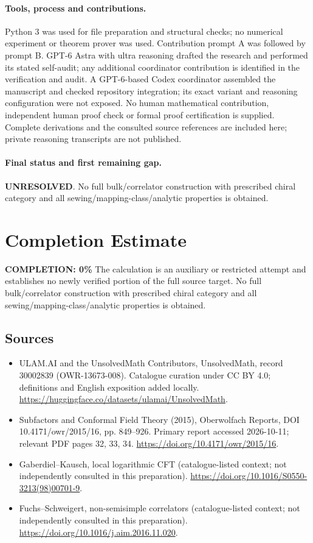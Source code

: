 \documentclass[11pt]{article}
\begin{document}
\paragraph{Tools, process and contributions.}
Python 3 was used for file preparation and structural checks; no numerical experiment or theorem prover was used. Contribution prompt A was followed by prompt B. GPT-6 Astra with ultra reasoning drafted the research and performed its stated self-audit; any additional coordinator contribution is identified in the verification and audit. A GPT-6-based Codex coordinator assembled the manuscript and checked repository integration; its exact variant and reasoning configuration were not exposed. No human mathematical contribution, independent human proof check or formal proof certification is supplied. Complete derivations and the consulted source references are included here; private reasoning transcripts are not published.

\paragraph{Final status and first remaining gap.}
\textbf{UNRESOLVED}. No full bulk/correlator construction with prescribed chiral category and all sewing/mapping-class/analytic properties is obtained.

\section{Completion Estimate}
\noindent\textbf{COMPLETION: 0\%}
The calculation is an auxiliary or restricted attempt and establishes no newly verified portion of the full source target. No full bulk/correlator construction with prescribed chiral category and all sewing/mapping-class/analytic properties is obtained.

\subsection{Sources}
\begin{itemize}
\item[\hypertarget{source:30002839:1}{S1}] ULAM.AI and the UnsolvedMath Contributors, UnsolvedMath, record 30002839 (OWR-13673-008). Catalogue curation under CC BY 4.0; definitions and English exposition added locally.
\url{https://huggingface.co/datasets/ulamai/UnsolvedMath}.
\item[\hypertarget{source:30002839:2}{S2}] Subfactors and Conformal Field Theory (2015), Oberwolfach Reports, DOI 10.4171/owr/2015/16, pp. 849--926. Primary report accessed 2026-10-11; relevant PDF pages 32, 33, 34.
\url{https://doi.org/10.4171/owr/2015/16}.
\item[\hypertarget{source:30002839:3}{S3}] Gaberdiel--Kausch, local logarithmic CFT (catalogue-listed context; not independently consulted in this preparation).
\url{https://doi.org/10.1016/S0550-3213(98)00701-9}.
\item[\hypertarget{source:30002839:4}{S4}] Fuchs--Schweigert, non-semisimple correlators (catalogue-listed context; not independently consulted in this preparation).
\url{https://doi.org/10.1016/j.aim.2016.11.020}.
\end{itemize}
\label{end:30002839}
\end{document}

